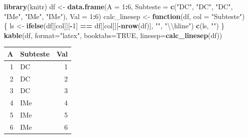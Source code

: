 \documentclass[
]{article}
\author{}
\date{\vspace{-2.5em}}
\newenvironment{Shaded}{\begin{snugshade}}{\end{snugshade}}
\newcommand{\CharTok}[1]{\textcolor[rgb]{0.31,0.60,0.02}{#1}}
\newcommand{\ControlFlowTok}[1]{\textcolor[rgb]{0.13,0.29,0.53}{\textbf{#1}}}
\newcommand{\DataTypeTok}[1]{\textcolor[rgb]{0.13,0.29,0.53}{#1}}
\newcommand{\DecValTok}[1]{\textcolor[rgb]{0.00,0.00,0.81}{#1}}
\newcommand{\KeywordTok}[1]{\textcolor[rgb]{0.13,0.29,0.53}{\textbf{#1}}}
\newcommand{\NormalTok}[1]{#1}
\newcommand{\OperatorTok}[1]{\textcolor[rgb]{0.81,0.36,0.00}{\textbf{#1}}}
\newcommand{\OtherTok}[1]{\textcolor[rgb]{0.56,0.35,0.01}{#1}}
\newcommand{\StringTok}[1]{\textcolor[rgb]{0.31,0.60,0.02}{#1}}
\begin{document}
\begin{Shaded}
\begin{Highlighting}[]
\KeywordTok{library}\NormalTok{(knitr)}
\NormalTok{df \textless{}{-}}\StringTok{ }\KeywordTok{data.frame}\NormalTok{(}\DataTypeTok{A =} \DecValTok{1}\OperatorTok{:}\DecValTok{6}\NormalTok{, }\DataTypeTok{Subteste =} \KeywordTok{c}\NormalTok{(}\StringTok{"DC"}\NormalTok{, }\StringTok{"DC"}\NormalTok{, }\StringTok{"DC"}\NormalTok{, }\StringTok{"IMe"}\NormalTok{, }\StringTok{"IMe"}\NormalTok{, }\StringTok{"IMe"}\NormalTok{), }\DataTypeTok{Val =} \DecValTok{1}\OperatorTok{:}\DecValTok{6}\NormalTok{)}
\NormalTok{calc\_linesep \textless{}{-}}\StringTok{ }\ControlFlowTok{function}\NormalTok{(df, }\DataTypeTok{col =} \StringTok{"Subteste"}\NormalTok{) \{}
\NormalTok{  ls \textless{}{-}}\StringTok{ }\KeywordTok{ifelse}\NormalTok{(df[[col]][}\OperatorTok{{-}}\DecValTok{1}\NormalTok{] }\OperatorTok{==}\StringTok{ }\NormalTok{df[[col]][}\OperatorTok{{-}}\KeywordTok{nrow}\NormalTok{(df)], }\StringTok{""}\NormalTok{, }\StringTok{"}\CharTok{\textbackslash{}\textbackslash{}}\StringTok{hline"}\NormalTok{)}
  \KeywordTok{c}\NormalTok{(ls, }\StringTok{""}\NormalTok{)}
\NormalTok{\}}
\KeywordTok{kable}\NormalTok{(df, }\DataTypeTok{format=}\StringTok{"latex"}\NormalTok{, }\DataTypeTok{booktabs=}\OtherTok{TRUE}\NormalTok{, }\DataTypeTok{linesep=}\KeywordTok{calc\_linesep}\NormalTok{(df))}
\end{Highlighting}
\end{Shaded}

\begin{tabular}{rlr}
\toprule
A & Subteste & Val\\
\midrule
1 & DC & 1\\
2 & DC & 2\\
3 & DC & 3\\
\hline
4 & IMe & 4\\
5 & IMe & 5\\
6 & IMe & 6\\
\bottomrule
\end{tabular}
\end{document}

